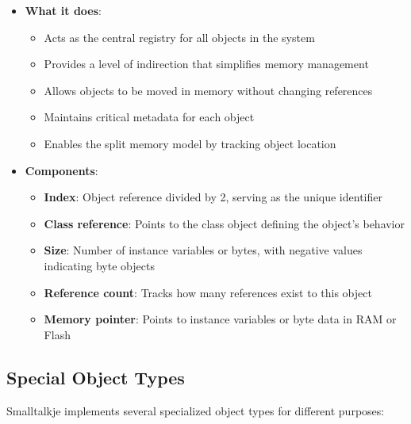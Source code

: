 \documentclass[12pt,a4paper]{report}
\begin{document}
\begin{itemize}
    \item \textbf{What it does}:
    \begin{itemize}
        \item Acts as the central registry for all objects in the system
        \item Provides a level of indirection that simplifies memory management
        \item Allows objects to be moved in memory without changing references
        \item Maintains critical metadata for each object
        \item Enables the split memory model by tracking object location
    \end{itemize}
    
    \item \textbf{Components}:
    \begin{itemize}
        \item \textbf{Index}: Object reference divided by 2, serving as the unique identifier
        \item \textbf{Class reference}: Points to the class object defining the object's behavior
        \item \textbf{Size}: Number of instance variables or bytes, with negative values indicating byte objects
        \item \textbf{Reference count}: Tracks how many references exist to this object
        \item \textbf{Memory pointer}: Points to instance variables or byte data in RAM or Flash
    \end{itemize}
\end{itemize}

\subsection{Special Object Types}
Smalltalkje implements several specialized object types for different purposes:
\end{document}

